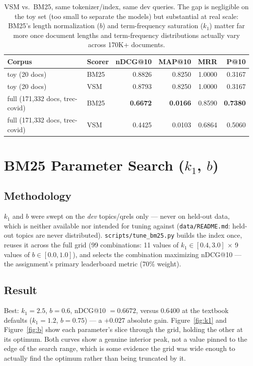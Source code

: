 \documentclass[11pt]{article}
\begin{document}
\begin{table}[h]
\centering
\begin{tabular}{llrrrr}
\toprule
Corpus & Scorer & nDCG@10 & MAP@10 & MRR & P@10 \\
\midrule
toy (20 docs)      & BM25 & 0.8826 & 0.8250 & 1.0000 & 0.3167 \\
toy (20 docs)      & VSM  & 0.8793 & 0.8250 & 1.0000 & 0.3167 \\
full (171{,}332 docs, trec-covid) & BM25 & \textbf{0.6672} & \textbf{0.0166} & 0.8590 & \textbf{0.7380} \\
full (171{,}332 docs, trec-covid) & VSM  & 0.4425 & 0.0103 & 0.6864 & 0.5060 \\
\bottomrule
\end{tabular}
\caption{VSM vs.\ BM25, same tokenizer/index, same dev queries. The gap
is negligible on the toy set (too small to separate the models) but
substantial at real scale: BM25's length normalization ($b$) and
term-frequency saturation ($k_1$) matter far more once document lengths
and term-frequency distributions actually vary across 170K+ documents.}
\end{table}

\section{BM25 Parameter Search ($k_1$, $b$)}

\subsection{Methodology}
$k_1$ and $b$ were swept on the \emph{dev} topics/qrels only ---
never on held-out data, which is neither available nor intended for
tuning against (\texttt{data/README.md}: held-out topics are never
distributed). \texttt{scripts/tune\_bm25.py} builds the index once,
reuses it across the full grid (99 combinations: 11 values of $k_1 \in
[0.4, 3.0]$ $\times$ 9 values of $b \in [0.0, 1.0]$), and selects the
combination maximizing nDCG@10 --- the assignment's primary leaderboard
metric (70\% weight).

\subsection{Result}
Best: $k_1{=}2.5$, $b{=}0.6$, nDCG@10 $= 0.6672$, versus $0.6400$ at the
textbook defaults ($k_1{=}1.2$, $b{=}0.75$) --- a $+0.027$ absolute gain.
Figure~\ref{fig:k1} and Figure~\ref{fig:b} show each parameter's slice
through the grid, holding the other at its optimum. Both curves show a
genuine interior peak, not a value pinned to the edge of the search
range, which is some evidence the grid was wide enough to actually find
the optimum rather than being truncated by it.
\end{document}
